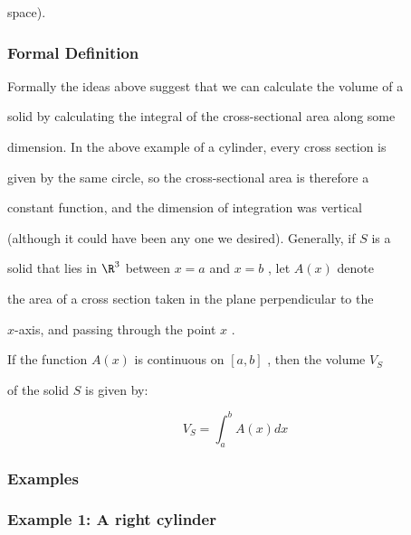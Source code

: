 space).


\subsubsection{Formal Definition}
\label{sss:form-5603}


Formally the ideas above suggest that we can calculate the volume of a

solid by calculating the integral of the cross-sectional area along some

dimension. In the above example of a cylinder, every cross section is

given by the same circle, so the cross-sectional area is therefore a

constant function, and the dimension of integration was vertical

(although it could have been any one we desired). Generally, if $S$ is a

solid that lies in $\R^3$ between $x=a$ and $x=b$ , let $A(x)$ denote

the area of a cross section taken in the plane perpendicular to the

$x$-axis, and passing through the point $x$ .


If the function $A(x)$ is continuous on $[a,b]$ , then the volume $V_S$

of the solid $S$ is given by:


\[
V_S = \int_a^b A(x) dx
\]


\subsubsection{Examples}
\label{sss:exam-bfeb}


\subsubsection{Example 1: A right cylinder}
\label{sss:exam-7dca}



